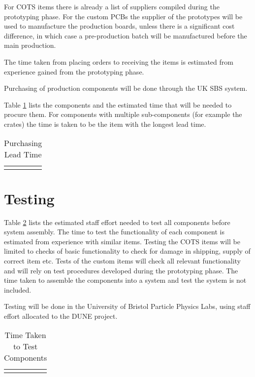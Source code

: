 \documentclass{article}
\begin{document}
For COTS items there is already a list of suppliers compiled during the prototyping phase. For the custom PCBs the supplier of the prototypes will be used to manufacture the production boards, unless there is a significant cost difference, in which case a pre-production batch will be manufactured before the main production.

The time taken from placing orders to receiving the items is estimated from experience gained from the prototyping phase.

Purchasing of production components will be done through the UK SBS system.

Table \ref{tab:dts-component-lead-time} lists the components and the estimated time that will be needed to procure them. For components with multiple sub-components (for example the  crates) the time is taken to be the item with the longest lead time.

\begin{table}[ht]
\begin{tabular}{p{6cm}  |p{3.5cm} }
\end{tabular}
\caption{Purchasing Lead Time}
\label{tab:dts-component-lead-time}
\end{table}

\section{Testing}

Table \ref{tab:dts-component-test-time} lists the estimated staff effort needed to test all components before system assembly. The time to test the functionality of each component is estimated from experience with similar items. Testing the COTS items will be limited to checks of basic functionality to check for damage in shipping, supply of correct item etc. Tests of the custom items will check all relevant functionality and will rely on test procedures developed during the prototyping phase. The time taken to assemble the components into a system and test the system is not included.

Testing will be done in the University of Bristol Particle Physics Labs, using staff effort allocated to the DUNE project.

\begin{table}[h!]
\begin{tabular}{p{4cm}  |p{2.5cm}| p{2.5cm}| p{2.5cm} }
\end{tabular}
\caption{Time Taken to Test Components}
\label{tab:dts-component-test-time}
\end{table}
\end{document}
